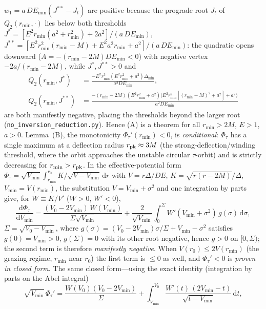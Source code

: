 \documentclass[12pt]{iopart}
\newcommand{\dd}{\mathrm{d}}
\begin{document}
$w_1=a\,DE_{\min}(J^{\ast\ast}-J_t)$ are positive because the prograde root $J_t$ of
$Q_2(r_{\min},\cdot)$ lies below both thresholds
$J^\ast=[E^2r_{\min}(a^2+r_{\min}^2)+2a^2]/(a\,DE_{\min})$,
$J^{\ast\ast}=[E^2r_{\min}^2(r_{\min}-M)+E^2a^2r_{\min}+a^2]/(a\,DE_{\min})$: the
quadratic opens downward ($A=-(r_{\min}-2M)DE_{\min}<0$) with negative vertex
$-2a/(r_{\min}-2M)$, while $J^\ast,J^{\ast\ast}>0$ and
\[
\begin{aligned}
Q_2(r_{\min},J^\ast)&=\frac{-E^2r_{\min}^3(E^2r_{\min}^2+a^2)\Delta_{\min}}{a^2DE_{\min}},\\[2pt]
Q_2(r_{\min},J^{\ast\ast})&=\frac{-(r_{\min}-2M)(E^2r_{\min}^2+a^2)\big(E^2r_{\min}^2[(r_{\min}-M)^2+a^2]+a^2\big)}{a^2DE_{\min}}
\end{aligned}
\]
are both manifestly negative, placing the thresholds beyond the larger root
(\texttt{no\_inversion\_reduction.py}). Hence (A) is a theorem for all $r_{\min}>2M$,
$E>1$, $a>0$. Lemma~(B), the monotonicity $\Phi_\tau'(r_{\min})<0$, is
\emph{conditional}: $\Phi_\tau$ has a single maximum at a deflection radius
$r_{\rm pk}\approx3M$ (the strong-deflection/winding threshold, where the orbit
approaches the unstable circular $\tau$-orbit) and is strictly decreasing for
$r_{\min}>r_{\rm pk}$. In the effective-potential form
$\Phi_\tau=\sqrt{V_{\min}}\int_{r_{\min}}^{r_0}K/\sqrt{V-V_{\min}}\,\dd r$ with
$V=r\Delta/DE$, $K=\sqrt{r(r-2M)}/\Delta$, $V_{\min}=V(r_{\min})$, the substitution
$V=V_{\min}+\sigma^2$ and one integration by parts give, for $W\equiv K/V'$
($W>0$, $W'<0$),
\begin{equation}
    \frac{\dd\Phi_\tau}{\dd V_{\min}}=
    \frac{(V_0-2V_{\min})\,W(V_{\min})}{\Sigma\sqrt{V_{\min}}}
    +\frac{2}{\sqrt{V_{\min}}}\!\int_0^{\Sigma}\!W'(V_{\min}+\sigma^2)\,g(\sigma)\,\dd\sigma,
\end{equation}
$\Sigma=\sqrt{V_0-V_{\min}}$, where $g(\sigma)=(V_0-2V_{\min})\sigma/\Sigma+V_{\min}-\sigma^2$
satisfies $g(0)=V_{\min}>0$, $g(\Sigma)=0$ with its other root negative, hence
$g>0$ on $[0,\Sigma)$; the second term is therefore \emph{manifestly negative}.
When $V(r_0)\le2V(r_{\min})$ (the grazing regime, $r_{\min}$ near $r_0$) the first
term is $\le0$ as well, and $\Phi_\tau'<0$ is \emph{proven in closed form}. The same
closed form---using the exact identity (integration by parts on the Abel integral)
\begin{equation}
    \sqrt{V_{\min}}\,\Phi_\tau'=\frac{W(V_0)(V_0-2V_{\min})}{\Sigma}
    +\int_{V_{\min}}^{V_0}\!\frac{W'(t)\,(2V_{\min}-t)}{\sqrt{t-V_{\min}}}\,\dd t ,
    \label{eq:phitau-closed}
\end{equation}
\end{document}
